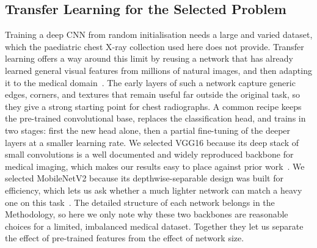 \documentclass[preprint,12pt]{elsarticle}
\begin{document}
\subsection{Transfer Learning for the Selected Problem}
Training a deep CNN from random initialisation needs a large and varied dataset, which the paediatric chest X-ray collection used here does not provide.
Transfer learning offers a way around this limit by reusing a network that has already learned general visual features from millions of natural images, and then adapting it to the medical domain~\cite{rahman2020transfer}.
The early layers of such a network capture generic edges, corners, and textures that remain useful far outside the original task, so they give a strong starting point for chest radiographs.
A common recipe keeps the pre-trained convolutional base, replaces the classification head, and trains in two stages: first the new head alone, then a partial fine-tuning of the deeper layers at a smaller learning rate.
We selected VGG16 because its deep stack of small convolutions is a well documented and widely reproduced backbone for medical imaging, which makes our results easy to place against prior work~\cite{simonyan2015very,ranjan2022transfer}.
We selected MobileNetV2 because its depthwise-separable design was built for efficiency, which lets us ask whether a much lighter network can match a heavy one on this task~\cite{sandler2018mobilenetv2,alreshan2023mobilenet}.
The detailed structure of each network belongs in the Methodology, so here we only note why these two backbones are reasonable choices for a limited, imbalanced medical dataset.
Together they let us separate the effect of pre-trained features from the effect of network size.
\end{document}
